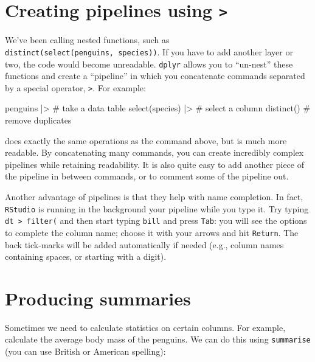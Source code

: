 \documentclass[
  letterpaper,
  DIV=11,
  numbers=noendperiod]{scrreprt}
\newenvironment{Shaded}{\begin{snugshade}}{\end{snugshade}}
\newcommand{\NormalTok}[1]{\textcolor[rgb]{0.00,0.23,0.31}{#1}}
\begin{document}
\section{\texorpdfstring{Creating pipelines using
\texttt{\textbar{}\textgreater{}}}{Creating pipelines using \textbar\textgreater{}}}\label{creating-pipelines-using}

We've been calling nested functions, such as
\texttt{distinct(select(penguins,\ species))}. If you have to add
another layer or two, the code would become unreadable. \texttt{dplyr}
allows you to ``un-nest'' these functions and create a ``pipeline'' in
which you concatenate commands separated by a special operator,
\texttt{\textbar{}\textgreater{}}. For example:

\begin{Shaded}
\begin{Highlighting}[]
\NormalTok{penguins |\textgreater{} \# take a data table}
\NormalTok{  select(species) |\textgreater{} \# select a column}
\NormalTok{  distinct() \# remove duplicates}
\end{Highlighting}
\end{Shaded}

does exactly the same operations as the command above, but is much more
readable. By concatenating many commands, you can create incredibly
complex pipelines while retaining readability. It is also quite easy to
add another piece of the pipeline in between commands, or to comment
some of the pipeline out.

Another advantage of pipelines is that they help with name completion.
In fact, \texttt{RStudio} is running in the background your pipeline
while you type it. Try typing
\texttt{dt\ \textbar{}\textgreater{}\ filter(} and then start typing
\texttt{bill} and press \texttt{Tab}: you will see the options to
complete the column name; choose it with your arrows and hit
\texttt{Return}. The back tick-marks will be added automatically if
needed (e.g., column names containing spaces, or starting with a digit).

\section{Producing summaries}\label{producing-summaries}

Sometimes we need to calculate statistics on certain columns. For
example, calculate the average body mass of the penguins. We can do this
using \texttt{summarise} (you can use British or American spelling):
\end{document}
